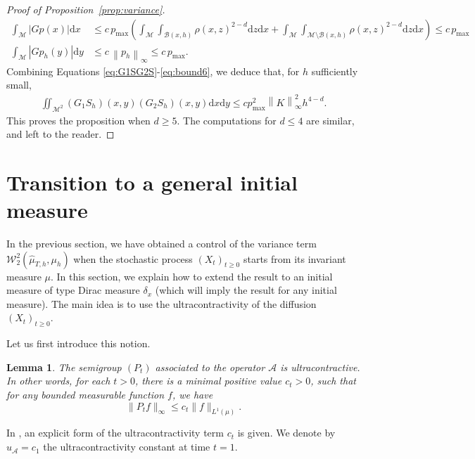 \documentclass[10pt,a4paper]{article}
\newcommand\cA{\mathcal{A}}
\newcommand\cB{\mathcal{B}}
\newcommand\cM{\mathcal{M}}
\newcommand\W{\mathcal{W}}
\newcommand\dd{\mathrm{d}}
\newcommand{\ABS}[1]{{{\left| #1 \right|}}} %
\newcommand{\NRM}[1]{{{\left\| #1\right\|}}} %
\newcommand{\PAR}[1]{{{\left(#1\right)}}} %
\let \ssection=\section
\renewcommand{\section}{\setcounter{equation}{0}\ssection}
\newtheorem{lemma}[theorem]{Lemma}
\begin{document}
\begin{proof}[Proof of Proposition~\ref{prop:variance}]
{\begin{align}
 \int_\cM\ABS{Gp(x)}\dd x&\le c\, p_{\max}\PAR{\int_\cM\int_{\cB(x,h)}\rho(x,z)^{2-d}\dd z\dd x+\int_\cM\int_{\cM\setminus\cB(x,h)}\rho(x,z)^{2-d}\dd z\dd x}
 \le c\, p_{\max}\label{eq:bound5}
 \\
 \int_\cM\ABS{Gp_h(y)}\dd y&\le c\, \NRM{p_h}_\infty \le c\, p_{\max}.
 \label{eq:bound6}
 \end{align}
 Combining Equations \eqref{eq:G1SG2S}-\eqref{eq:bound6}, we deduce that, for $h$ sufficiently small,
 \begin{align*}
 \iint_{\cM^2}(G_1S_h)(x,y)(G_2S_h)(x,y)\dd x\dd y\le cp_{\max}^2\NRM{K}_\infty^2 h^{4-d}.
 \end{align*}
}
This proves the proposition when $d\ge 5$. The computations for $d\le 4$ are similar, and left  to the reader.
\end{proof}



\section{Transition to a general initial measure}\label{sec:general-distribution}


In the previous section, we have obtained a control of the variance term $\W_2^2(\widehat{\mu}_{T,h},\mu_h)$  when the stochastic process $(X_t)_{t\ge 0}$ starts from its invariant measure $\mu$. In this section, we explain how to extend the result to an initial measure of type Dirac measure $\delta_x$  (which will imply the result for any initial measure).
The main idea is to use the  ultracontractivity of the diffusion $(X_t)_{t\ge 0}$.


Let us first introduce this notion.
\begin{lemma} \cite[Theorem 3.5.5.]{Wang2014}  \label{lemma: ultracontractivity}
	The semigroup $(P_t)$ associated to the operator $\cA$
 is ultracontractive. In other words, for each $t>0$, there is a minimal positive value $c_t>0$, such that for any bounded measurable function $f$, we have
	\begin{equation}   \|  P_tf \|_{\infty} \le c_t\|f\|_{L^1(\mu)}  .\label{eq:constante_ct}
	\end{equation}
\end{lemma}
 In , an explicit form of the ultracontractivity term $c_t$ is given.
  We denote by $u_\cA=c_1$ the ultracontractivity constant at time $t=1$.
\end{document}
